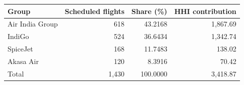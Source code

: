 \begin{tabular}{@{}lrrr@{}}
\toprule
Group & Scheduled flights & Share (\%) & HHI contribution \\
\midrule
Air India Group & 618 & 43.2168 & 1,867.69 \\
IndiGo & 524 & 36.6434 & 1,342.74 \\
SpiceJet & 168 & 11.7483 & 138.02 \\
Akasa Air & 120 & 8.3916 & 70.42 \\
\midrule
Total & 1,430 & 100.0000 & 3,418.87 \\
\bottomrule
\end{tabular}
